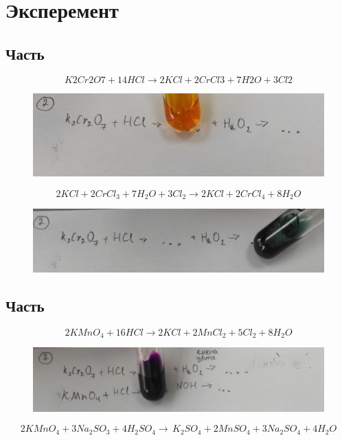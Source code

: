 \section{Эксперемент}
\subsection{Часть}
\begin{equation} 
    K2Cr2O7 + 14HCl \xrightarrow{}  2KCl + 2CrCl3 + 7H2O + 3Cl2
\end{equation} 
\begin{figure}[h]
    \centering
    \includegraphics[width=1\linewidth]{Ex_3/Ex_3_1_1.jpg}
     \caption{}
    \label{ex_3_1_1}
\end{figure}
\begin{equation} 
    2KCl + 2CrCl_3 + 7H_2O + 3Cl_2 
    \xrightarrow{} 2KCl + 2CrCl_ 4 + 8H_2O 
\end{equation} 
\begin{figure}[h]
    \centering
    \includegraphics[width=1\linewidth]{Ex_3/Ex_3_1_2.jpg}
     \caption{}
    \label{ex_3_1_2}
\end{figure}


\subsection{Часть}
\begin{equation} 
    2KMnO_4 + 16HCl \xrightarrow{} 
    2KCl + 2MnCl_2 + 5Cl_2 + 8H_2O
\end{equation} 
\begin{figure}[h]
    \centering
    \includegraphics[width=1\linewidth]{Ex_3/Ex_3_2_1.jpg}
     \caption{}
    \label{ex_3_2_1}
\end{figure}
\begin{equation} 
    2KMnO_4 + 3Na_2SO_3 + 4H_2SO_4 \xrightarrow{}\, 
    K_2SO_4 + 2MnSO_4 + 3Na_2SO_4 + 4H_2O 
\end{equation} 


